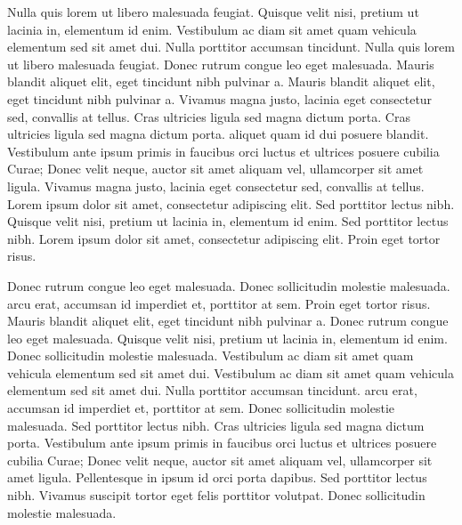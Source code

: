 \documentclass{article}
\begin{document}
Nulla quis lorem ut libero malesuada feugiat. Quisque velit nisi, pretium ut lacinia in, elementum id enim. Vestibulum ac diam sit amet quam vehicula elementum sed sit amet dui. Nulla porttitor accumsan tincidunt. Nulla quis lorem ut libero malesuada feugiat. Donec rutrum congue leo eget malesuada. Mauris blandit aliquet elit, eget tincidunt nibh pulvinar a. Mauris blandit aliquet elit, eget tincidunt nibh pulvinar a. Vivamus magna justo, lacinia eget consectetur sed, convallis at tellus. Cras ultricies ligula sed magna dictum porta. Cras ultricies ligula sed magna dictum porta.  aliquet quam id dui posuere blandit. Vestibulum ante ipsum primis in faucibus orci luctus et ultrices posuere cubilia Curae; Donec velit neque, auctor sit amet aliquam vel, ullamcorper sit amet ligula. Vivamus magna justo, lacinia eget consectetur sed, convallis at tellus. Lorem ipsum dolor sit amet, consectetur adipiscing elit. Sed porttitor lectus nibh. Quisque velit nisi, pretium ut lacinia in, elementum id enim. Sed porttitor lectus nibh. Lorem ipsum dolor sit amet, consectetur adipiscing elit. Proin eget tortor risus.

Donec rutrum congue leo eget malesuada. Donec sollicitudin molestie malesuada.  arcu erat, accumsan id imperdiet et, porttitor at sem. Proin eget tortor risus. Mauris blandit aliquet elit, eget tincidunt nibh pulvinar a. Donec rutrum congue leo eget malesuada. Quisque velit nisi, pretium ut lacinia in, elementum id enim. Donec sollicitudin molestie malesuada. Vestibulum ac diam sit amet quam vehicula elementum sed sit amet dui. Vestibulum ac diam sit amet quam vehicula elementum sed sit amet dui. Nulla porttitor accumsan tincidunt.  arcu erat, accumsan id imperdiet et, porttitor at sem. Donec sollicitudin molestie malesuada. Sed porttitor lectus nibh. Cras ultricies ligula sed magna dictum porta. Vestibulum ante ipsum primis in faucibus orci luctus et ultrices posuere cubilia Curae; Donec velit neque, auctor sit amet aliquam vel, ullamcorper sit amet ligula. Pellentesque in ipsum id orci porta dapibus. Sed porttitor lectus nibh. Vivamus suscipit tortor eget felis porttitor volutpat. Donec sollicitudin molestie malesuada.
\end{document}
